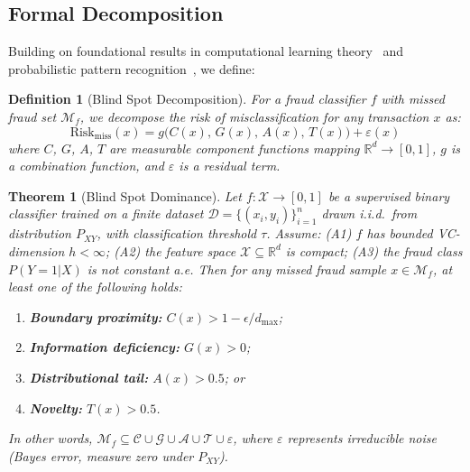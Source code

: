 \documentclass[journal]{IEEEtran}
\newcommand{\R}{\mathbb{R}}
\newtheorem{definition}{Definition}
\newtheorem{theorem}{Theorem}
\begin{document}
\subsection{Formal Decomposition}
\label{ssec:decomposition}

Building on foundational results in computational learning theory~\cite{valiant1984} and probabilistic pattern recognition~\cite{devroye1996}, we define:

\begin{definition}[Blind Spot Decomposition]
For a fraud classifier $f$ with missed fraud set $\mathcal{M}_f$, we decompose the risk of misclassification for any transaction $x$ as:
\begin{equation}
  \text{Risk}_{\text{miss}}(x) = g\bigl(C(x),\, G(x),\, A(x),\, T(x)\bigr) + \varepsilon(x)
  \label{eq:decomposition}
\end{equation}
where $C$, $G$, $A$, $T$ are measurable component functions mapping $\R^d \to [0,1]$, $g$ is a combination function, and $\varepsilon$ is a residual term.
\end{definition}

\begin{theorem}[Blind Spot Dominance]
\label{thm:bsd}
Let $f: \mathcal{X} \to [0,1]$ be a supervised binary classifier trained on a finite dataset $\mathcal{D} = \{(x_i, y_i)\}_{i=1}^n$ drawn i.i.d.\ from distribution $P_{XY}$, with classification threshold $\tau$. Assume: (A1) $f$ has bounded VC-dimension $h < \infty$; (A2) the feature space $\mathcal{X} \subseteq \R^d$ is compact; (A3) the fraud class $P(Y{=}1|X)$ is not constant a.e. Then for any missed fraud sample $x \in \mathcal{M}_f$, at least one of the following holds:
\begin{enumerate}[label=(\roman*)]
  \item \textbf{Boundary proximity:} $C(x) > 1 - \epsilon / d_{\max}$;
  \item \textbf{Information deficiency:} $G(x) > 0$;
  \item \textbf{Distributional tail:} $A(x) > 0.5$; or
  \item \textbf{Novelty:} $T(x) > 0.5$.
\end{enumerate}
In other words, $\mathcal{M}_f \subseteq \mathcal{C} \cup \mathcal{G} \cup \mathcal{A} \cup \mathcal{T} \cup \varepsilon$, where $\varepsilon$ represents irreducible noise (Bayes error, measure zero under $P_{XY}$).
\end{theorem}
\end{document}
